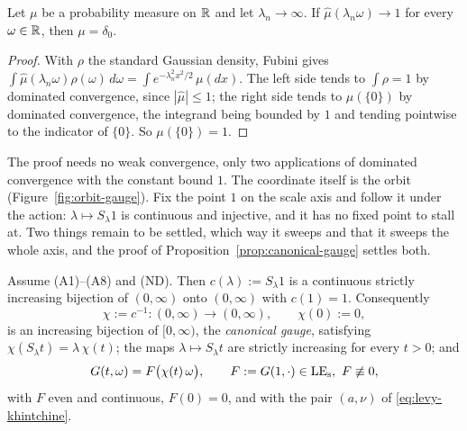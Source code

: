 \begin{lemma}\label{lem:dilation-atom}
Let $\mu$ be a probability measure on $\mathbb{R}$ and let $\lambda_n \to \infty$. If
$\hat\mu(\lambda_n\omega) \to 1$ for every $\omega \in \mathbb{R}$, then $\mu = \delta_0$.
\end{lemma}

\begin{proof}
With $\rho$ the standard Gaussian density, Fubini gives
$\int \hat\mu(\lambda_n\omega)\rho(\omega)\,d\omega = \int e^{-\lambda_n^2x^2/2}\,\mu(dx)$. The
left side tends to $\int\rho = 1$ by dominated convergence, since $|\hat\mu| \le 1$; the right
side tends to $\mu(\{0\})$ by dominated convergence, the integrand being bounded by $1$ and
tending pointwise to the indicator of $\{0\}$. So $\mu(\{0\}) = 1$.
\end{proof}

The proof needs no weak convergence, only two applications of dominated convergence
with the constant bound $1$. The coordinate itself is the orbit (Figure~\ref{fig:orbit-gauge}).
Fix the point $1$ on the scale axis and follow it under the action: $\lambda \mapsto S_\lambda 1$
is continuous and injective, and it has no fixed point to stall at. Two things remain to be
settled, which way it sweeps and that it sweeps the whole axis, and the proof of
Proposition~\ref{prop:canonical-gauge} settles both.



\begin{proposition}\label{prop:canonical-gauge}
Assume (A1)--(A8) and (ND). Then $c(\lambda) := S_\lambda 1$ is a continuous strictly
increasing bijection of $(0,\infty)$ onto $(0,\infty)$ with $c(1) = 1$. Consequently
\[
  \chi := c^{-1} : (0,\infty) \to (0,\infty), \qquad \chi(0) := 0,
\]
is an increasing bijection of $[0,\infty)$, the \emph{canonical gauge}, satisfying
$\chi(S_\lambda t) = \lambda\,\chi(t)$; the maps $\lambda \mapsto S_\lambda t$ are strictly
increasing for every $t > 0$; and
\begin{equation}\label{eq:gauge}
  G(t,\omega) = F\bigl(\chi(t)\,\omega\bigr), \qquad F := G(1,\cdot) \in \mathrm{LE}_{\mathrm{s}},\ F \not\equiv 0,
\end{equation}
with $F$ even and continuous, $F(0) = 0$, and with the pair $(a,\nu)$ of
\ref{eq:levy-khintchine}.
\end{proposition}

